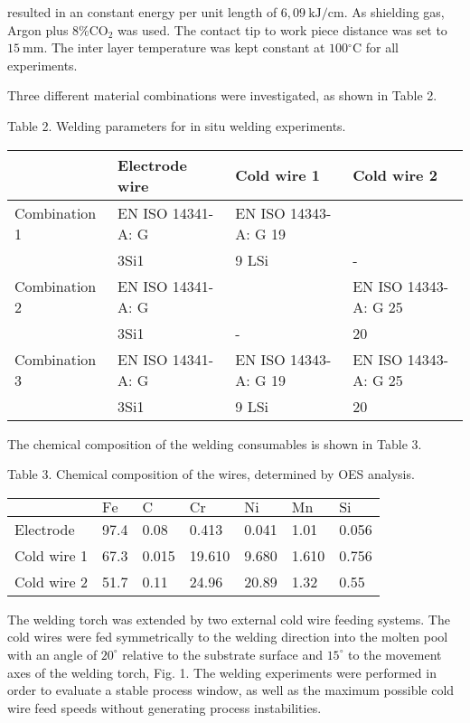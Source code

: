 \documentclass[10pt]{article}
\begin{document}
resulted in an constant energy per unit length of $6,09 \mathrm{~kJ} / \mathrm{cm}$. As shielding gas, Argon plus $8 \% \mathrm{CO}_{2}$ was used. The contact tip to work piece distance was set to $15 \mathrm{~mm}$. The inter layer temperature was kept constant at $100{ }^{\circ} \mathrm{C}$ for all experiments.

Three different material combinations were investigated, as shown in Table 2.

Table 2. Welding parameters for in situ welding experiments.

\begin{center}
\begin{tabular}{l|l|l|l}
\hline
 & Electrode wire & Cold wire 1 & Cold wire 2 \\
\hline
Combination 1 & EN ISO 14341-A: G & EN ISO 14343-A: G 19 &  \\
 & 3Si1 & 9 LSi & - \\
\hline
Combination 2 & EN ISO 14341-A: G &  & EN ISO 14343-A: G 25 \\
 & 3Si1 & - & 20 \\
\hline
Combination 3 & EN ISO 14341-A: G & EN ISO 14343-A: G 19 & EN ISO 14343-A: G 25 \\
 & 3Si1 & 9 LSi & 20 \\
\hline
\end{tabular}
\end{center}

The chemical composition of the welding consumables is shown in Table 3.

Table 3. Chemical composition of the wires, determined by OES analysis.

\begin{center}
\begin{tabular}{l|l|l|l|l|l|l}
\hline
 & $\mathrm{Fe}$ & $\mathrm{C}$ & $\mathrm{Cr}$ & $\mathrm{Ni}$ & $\mathrm{Mn}$ & $\mathrm{Si}$ \\
\hline
Electrode & 97.4 & 0.08 & 0.413 & 0.041 & 1.01 & 0.056 \\
\hline
Cold wire 1 & 67.3 & 0.015 & 19.610 & 9.680 & 1.610 & 0.756 \\
\hline
Cold wire 2 & 51.7 & 0.11 & 24.96 & 20.89 & 1.32 & 0.55 \\
\hline
\end{tabular}
\end{center}

The welding torch was extended by two external cold wire feeding systems. The cold wires were fed symmetrically to the welding direction into the molten pool with an angle of $20^{\circ}$ relative to the substrate surface and $15^{\circ}$ to the movement axes of the welding torch, Fig. 1. The welding experiments were performed in order to evaluate a stable process window, as well as the maximum possible cold wire feed speeds without generating process instabilities.
\end{document}
